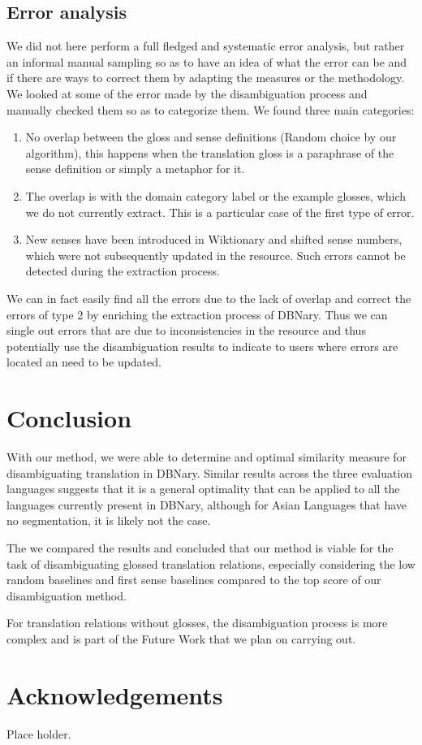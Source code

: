 \documentclass[10pt, a4paper]{article}
\begin{document}
\subsection{Error analysis}

We did not here perform a full fledged and systematic error analysis, but rather an informal manual sampling so as to have an idea of what the error can be and if there are ways to correct them by adapting the measures or the methodology.
We looked at some of the error made by the disambiguation process and manually checked them so as to categorize them. We found three main categories:
\begin{enumerate}
\item No overlap between the gloss and sense definitions (Random choice by our algorithm), this happens when the translation gloss is a paraphrase of the sense definition or simply a metaphor for it.
\item The overlap is with the domain category label or the example glosses, which we do not currently extract. This is a particular case of the first type of error.
\item New senses have been introduced in Wiktionary and shifted sense numbers, which were not subsequently updated in the resource. Such errors cannot be detected during the extraction process.
\end{enumerate}

We can in fact easily find all the errors due to the lack of overlap and correct the errors of type 2 by enriching the extraction process of DBNary. Thus we can single out errors that are due to inconsistencies in the resource and thus potentially use the disambiguation results to indicate to users where errors are located an need to be updated.

\section{Conclusion}

With our method, we were able to determine and optimal similarity measure for disambiguating translation in DBNary. Similar results across the three evaluation languages suggests that it is a general optimality that can be applied to all the languages currently present in DBNary, although for Asian Languages that have no segmentation, it is likely not the case.

The we compared the results and concluded that our method is viable for the task of disambiguating glossed translation relations, especially considering the low random baselines and first sense baselines compared to the top score of our disambiguation method.

For translation relations without glosses, the disambiguation process is more complex and is part of the Future Work that we plan on carrying out.

\section{Acknowledgements}

Place holder.




\end{document}
